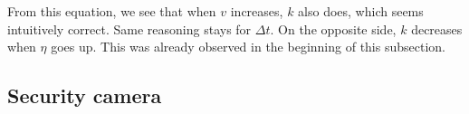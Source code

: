 From this equation, we see that when $v$ increases, $k$ also does, which seems intuitively correct. Same reasoning stays for $\Delta t$. On the opposite side, $k$ decreases when $\eta$ goes up. This was already observed in the beginning of this subsection.


\subsection{Security camera}
